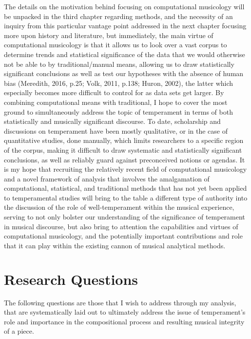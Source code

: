 The details on the motivation behind focusing on computational
musicology will be unpacked in the third chapter regarding methods, and
the necessity of an inquiry from this particular vantage point addressed
in the next chapter focusing more upon history and literature, but
immediately, the main virtue of computational musicology is that it
allows us to look over a vast corpus to determine trends and statistical
significance of the data that we would otherwise not be able to by
traditional/manual means, allowing us to draw statistically significant
conclusions as well as test our hypotheses with the absence of human
bias (Meredith, 2016, p.25; Volk, 2011, p.138; Huron, 2002), the latter
which especially becomes more difficult to control for as data sets get
larger. By combining computational means with traditional, I hope to
cover the most ground to simultaneously address the topic of temperament
in terms of both statistically and musically significant discourse. To
date, scholarship and discussions on temperament have been mostly
qualitative, or in the case of quantitative studies, done manually,
which limits researchers to a specific region of the corpus, making it
difficult to draw systematic and statistically significant conclusions,
as well as reliably guard against preconceived notions or agendas. It is
my hope that recruiting the relatively recent field of computational
musicology and a novel framework of analysis that involves the
amalgamation of computational, statistical, and traditional methods that
has not yet been applied to temperamental studies will bring to the
table a different type of authority into the discussion of the role of
well-temperament within the musical experience, serving to not only
bolster our understanding of the significance of temperament in musical
discourse, but also bring to attention the capabilities and virtues of
computational musicology, and the potentially important contributions
and role that it can play within the existing cannon of musical
analytical methods.

    \section{Research Questions}\label{research-questions}

The following questions are those that I wish to address through my
analysis, that are systematically laid out to ultimately address the
issue of temperament's role and importance in the compositional process
and resulting musical integrity of a piece.

